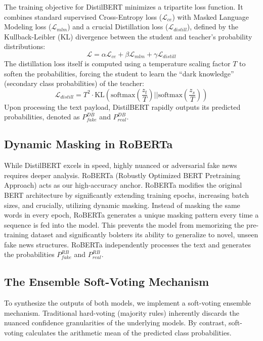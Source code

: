 \documentclass[conference]{IEEEtran}
\begin{document}
The training objective for DistilBERT minimizes a tripartite loss function. It combines standard supervised Cross-Entropy loss ($\mathcal{L}_{ce}$) with Masked Language Modeling loss ($\mathcal{L}_{mlm}$) and a crucial Distillation loss ($\mathcal{L}_{distill}$), defined by the Kullback-Leibler (KL) divergence between the student and teacher's probability distributions:
\begin{equation}
\mathcal{L} = \alpha \mathcal{L}_{ce} + \beta \mathcal{L}_{mlm} + \gamma \mathcal{L}_{distill}
\end{equation}
The distillation loss itself is computed using a temperature scaling factor $T$ to soften the probabilities, forcing the student to learn the ``dark knowledge'' (secondary class probabilities) of the teacher:
\begin{equation}
\mathcal{L}_{distill} = T^2 \cdot \text{KL}\left(\text{softmax}\left(\frac{z_t}{T}\right) \Big|\Big| \text{softmax}\left(\frac{z_s}{T}\right)\right)
\end{equation}
Upon processing the text payload, DistilBERT rapidly outputs its predicted probabilities, denoted as $P_{fake}^{DB}$ and $P_{real}^{DB}$.

\subsection{Dynamic Masking in RoBERTa}
While DistilBERT excels in speed, highly nuanced or adversarial fake news requires deeper analysis. RoBERTa (Robustly Optimized BERT Pretraining Approach) acts as our high-accuracy anchor. RoBERTa modifies the original BERT architecture by significantly extending training epochs, increasing batch sizes, and crucially, utilizing dynamic masking. Instead of masking the same words in every epoch, RoBERTa generates a unique masking pattern every time a sequence is fed into the model. This prevents the model from memorizing the pre-training dataset and significantly bolsters its ability to generalize to novel, unseen fake news structures. RoBERTa independently processes the text and generates the probabilities $P_{fake}^{RB}$ and $P_{real}^{RB}$.

\subsection{The Ensemble Soft-Voting Mechanism}
To synthesize the outputs of both models, we implement a soft-voting ensemble mechanism. Traditional hard-voting (majority rules) inherently discards the nuanced confidence granularities of the underlying models. By contrast, soft-voting calculates the arithmetic mean of the predicted class probabilities.
\end{document}
